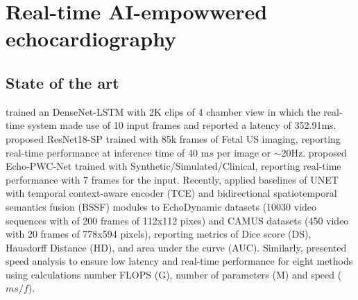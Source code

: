 \documentclass[mlabstract,twocolumn]{jmlr}
\begin{document}
\section{Real-time AI-empowwered echocardiography}
\subsection{State of the art}  \label{subsec:State_of_the_art}
\citet{woudenberg2018} trained an DenseNet-LSTM with 2K clips of 4 chamber view in which the real-time system made use of 10 input frames and reported a latency of 352.91ms.
\citet{toussaint2018-MICCAI} proposed ResNet18-SP trained with 85k frames of Fetal US imaging, reporting real-time performance at inference time of 40 m$s$ per image or $\sim$20Hz.
\citet{ostvik2021-TMI} proposed Echo-PWC-Net trained with Synthetic/Simulated/Clinical, reporting real-time performance with 7 frames for the input.
Recently, \citet{wu2022} applied baselines of UNET with temporal context-aware encoder (TCE) and bidirectional spatiotemporal semantics fusion (BSSF) modules to EchoDynamic datasets (10030 video sequences with of 200 frames of 112x112 pixes) and CAMUS datasets  (450 video with 20 frames of 778x594 pixels), reporting metrics of Dice score (DS), Hausdorff Distance (HD), and area under the curve (AUC).
Similarly, \citet{wu2022} presented speed analysis to ensure low latency and real-time performance for eight methods using calculations number FLOPS (G), number of parameters (M) and speed ($ms/f$).
\end{document}
